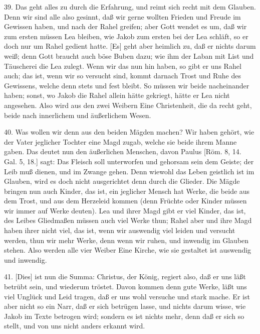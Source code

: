 39. Das geht alles zu durch die Erfahrung, und reimt sich recht mit dem Glauben. Denn wir sind alle also gesinnt, daß wir gerne wollten Frieden und Freude im Gewissen haben, und nach der Rahel greifen; aber Gott wendet es um, daß wir zum ersten müssen Lea bleiben, wie Jakob zum ersten bei der Lea schläft, so er doch nur um Rahel gedient hatte. [Es] geht aber heimlich zu, daß er nichts darum weiß; denn Gott braucht auch böse Buben dazu; wie ihm der Laban mit List und Täuscherei die Lea zulegt. Wenn wir das nun hin haben, so gibt er uns Rahel auch; das ist, wenn wir so versucht sind, kommt darnach Trost und Ruhe des Gewissens, welche denn stets und fest bleibt. So müssen wir beide nacheinander haben; sonst, wo Jakob die Rahel allein hätte gekriegt, hätte er Lea nicht angesehen. Also wird aus den zwei Weibern Eine Christenheit, die da recht geht, beide nach innerlichem und äußerlichem Wesen.

40. Was wollen wir denn aus den beiden Mägden machen? Wir haben gehört, wie der Vater jeglicher Tochter eine Magd zugab, welche sie beide ihrem Manne gaben. Das deutet nun
den äußerlichen Menschen, davon Paulus [Röm. 8, 14. Gal. 5, 18.] sagt: Das Fleisch soll unterworfen und gehorsam sein dem Geiste; der Leib muß dienen, und im Zwange gehen. Denn wiewohl das Leben geistlich ist im Glauben, wird es doch nicht ausgerichtet denn durch die Glieder. Die Mägde bringen nun auch Kinder, das ist, ein jeglicher Mensch hat Werke, die beide aus dem Trost, und aus dem Herzeleid kommen (denn Früchte oder Kinder müssen wir immer auf Werke deuten). Lea und ihrer Magd gibt er viel Kinder, das ist, des Leibes Gliedmaßen müssen auch viel Werke thun; Rahel aber und ihre Magd haben ihrer nicht viel, das ist, wenn wir auswendig viel leiden und versucht werden, thun wir mehr Werke, denn wenn wir ruhen, und inwendig im Glauben stehen. Also werden alle vier Weiber Eine Kirche, wie sie gestaltet ist auswendig und inwendig.

41. [Dies] ist nun die Summa: Christus, der König, regiert also, daß er uns läßt betrübt sein, und wiederum tröstet. Davon kommen denn gute Werke, läßt uns viel Unglück und Leid tragen, daß er uns wohl versuche und stark mache. Er ist aber nicht so ein Narr, daß er sich betrügen lasse, und nichts darum wisse, wie Jakob im Texte betrogen wird; sondern es ist nichts mehr, denn daß er sich so stellt, und von uns nicht anders erkannt wird.

